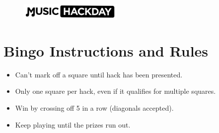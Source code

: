 


\begin{figure}[h]
    \centering
    \includegraphics[width=5cm]{./mhdlogo.jpg}
\end{figure}


\section*{Bingo Instructions and Rules}
\begin{itemize}
\item Can't mark off a square until hack has been presented.
\item Only one square per hack, even if it qualifies for multiple squares.
\item Win by crossing off 5 in a row (diagonals accepted).
\item Keep playing until the prizes run out.
\end{itemize}

\vspace{0.5cm}
